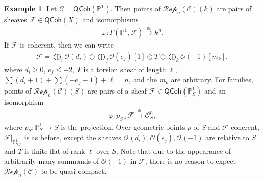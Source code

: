 \documentclass{article}
\numberwithin{equation}{section}
\theoremstyle{quest}
\theoremstyle{definition}
\newtheorem{ex}[thm]{Example}
\theoremstyle{remark}
\begin{document}
 
\begin{ex}\label{ex:P^1-example}
	Let $\mathcal{C}=\mathsf{QCoh}(\mathbb{P} ^1)$. Then points of $\mathscr{Rep}_n(\mathcal{C})(k)$ are pairs of sheaves $\mathscr{F}\in \mathsf{QCoh}(X)$ and isomorphisms
	\begin{align*}
		\varphi:\Gamma(\mathbb{P} ^1,\mathscr{F})\xrightarrow{\cong}k^n.
	\end{align*} 
	If $\mathscr{F}$ is coherent, then we can write 
	\begin{align*}
		\mathscr{F}=\bigoplus_i \mathscr{O}(d_i)\oplus \bigoplus _{j}\mathscr{O}(e_j)[1]\oplus T \oplus \bigoplus _{k} \mathscr{O}(-1)[m_k],
	\end{align*} 
	where $d_i\ge 0$, $e_j\le -2$, $T$ is a torsion sheaf of length $\ell$, $\sum(d_i+1) + \sum(-e_j-1)+\ell=n$, and the $m_k$ are arbitrary. For families, points of $\mathscr{Rep}_n(\mathcal{C})(S)$ are pairs of a sheaf $\mathscr{F}\in \mathsf{QCoh}(\mathbb{P} ^1_S)$ and an isomorphism
	\begin{align*}
		\varphi:p_{S*}\mathscr{F}\xrightarrow{\cong}\mathscr{O}_S^n,
	\end{align*} 
	where $p_{S}:\mathbb{P} ^1_S\to S$ is the projection. Over geometric points $p$ of $S$ and $\mathscr{F}$ coherent, $\mathscr{F}|_{\mathbb{P} ^1_{S,p}}$ is as before, except the sheaves $\mathscr{O}(d_i),  \mathscr{O}(e_j),  \mathscr{O}(-1)$ are relative to $S$ and $T$ is finite flat of rank $\ell$ over $S$. Note that due to the appearance of arbitrarily many summands of $\mathscr{O}(-1)$ in $\mathscr{F}$, there is no reason to expect $\mathscr{Rep}_n(\mathcal{C})$ to be quasi-compact.
\end{ex} 
\end{document}
